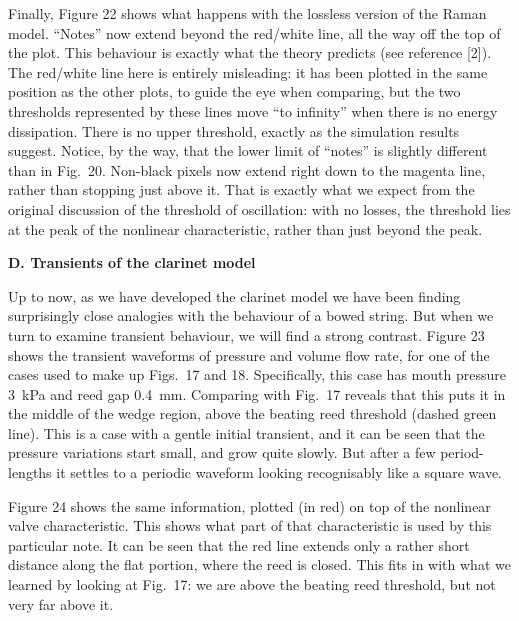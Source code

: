   Finally, Figure 22 shows what happens with the lossless version of the Raman 
  model. “Notes” now extend beyond the red/white line, all the way off the top 
  of the plot. This behaviour is exactly what the theory predicts (see 
  reference [2]). The red/white line here is entirely misleading: it has been 
  plotted in the same position as the other plots, to guide the eye when 
  comparing, but the two thresholds represented by these lines move “to 
  infinity” when there is no energy dissipation. There is no upper threshold, 
  exactly as the simulation results suggest. Notice, by the way, that the lower 
  limit of “notes” is slightly different than in Fig.\ 20. Non-black pixels now 
  extend right down to the magenta line, rather than stopping just above it. 
  That is exactly what we expect from the original discussion of the threshold 
  of oscillation: with no losses, the threshold lies at the peak of the 
  nonlinear characteristic, rather than just beyond the peak. 



  \textbf{D. Transients of the clarinet model} 

  Up to now, as we have developed the clarinet model we have been finding 
  surprisingly close analogies with the behaviour of a bowed string. But when 
  we turn to examine transient behaviour, we will find a strong contrast. 
  Figure 23 shows the transient waveforms of pressure and volume flow rate, for 
  one of the cases used to make up Figs.\ 17 and 18. Specifically, this case 
  has mouth pressure 3~kPa and reed gap 0.4~mm. Comparing with Fig.\ 17 reveals 
  that this puts it in the middle of the wedge region, above the beating reed 
  threshold (dashed green line). This is a case with a gentle initial 
  transient, and it can be seen that the pressure variations start small, and 
  grow quite slowly. But after a few period-lengths it settles to a periodic 
  waveform looking recognisably like a square wave. 


  Figure 24 shows the same information, plotted (in red) on top of the 
  nonlinear valve characteristic. This shows what part of that characteristic 
  is used by this particular note. It can be seen that the red line extends 
  only a rather short distance along the flat portion, where the reed is 
  closed. This fits in with what we learned by looking at Fig.\ 17: we are 
  above the beating reed threshold, but not very far above it. 

